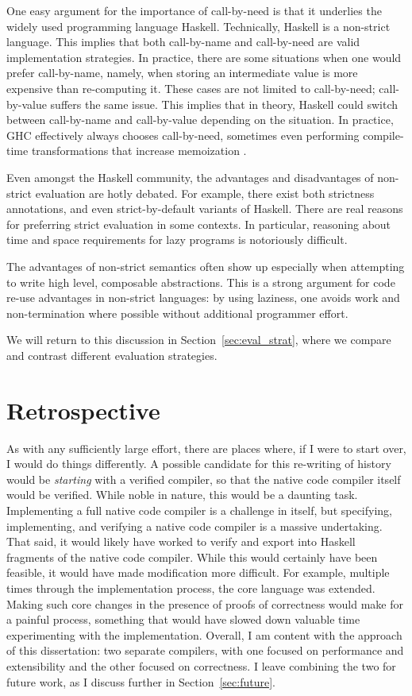 One easy argument for the importance of call-by-need is that it underlies the
widely used programming language Haskell. Technically, Haskell is a non-strict
language.  This implies that both call-by-name and call-by-need are valid
implementation strategies. In practice, there are some situations when one would
prefer call-by-name, namely, when storing an intermediate value is more
expensive than re-computing it. These cases are not limited to call-by-need;
call-by-value suffers the same issue.  This implies that in theory, Haskell
could switch between call-by-name and call-by-value depending on the situation.
In practice, GHC effectively always chooses call-by-need, sometimes even
performing compile-time transformations that increase memoization
\cite{jones96floating}.  

Even amongst the Haskell community, the advantages and disadvantages of
non-strict evaluation are hotly debated. For example, there exist both
strictness annotations, and even strict-by-default variants of Haskell. There
are real reasons for preferring strict evaluation in some contexts. In
particular, reasoning about time and space requirements for lazy programs is
notoriously difficult.  

The advantages of non-strict semantics often show up especially when attempting
to write high level, composable abstractions. This is a strong argument for code
re-use advantages in non-strict languages: by using laziness, one avoids work
and non-termination where possible without additional programmer effort.

We will return to this discussion in Section~\ref{sec:eval_strat}, where we compare
and contrast different evaluation strategies.

\section{Retrospective}

As with any sufficiently large effort, there are places where, if I were to
start over, I would do things differently. A possible candidate for this
re-writing of history would be \emph{starting} with a verified compiler, so that
the native code compiler itself would be verified. While noble in nature, this
would be a daunting task. Implementing a full native code compiler is a
challenge in itself, but specifying, implementing, and verifying a native code
compiler is a massive undertaking. That said, it would likely have worked to
verify and export into Haskell fragments of the native code compiler. While this
would certainly have been feasible, it would have made modification more
difficult. For example, multiple times through the implementation process, the
core language was extended. Making such core changes in the presence of proofs
of correctness would make for a painful process, something that would have
slowed down valuable time experimenting with the implementation. Overall, I am
content with the approach of this dissertation: two separate compilers, with one
focused on performance and extensibility and the other focused on correctness. I
leave combining the two for future work, as I discuss further in
Section~\ref{sec:future}.

